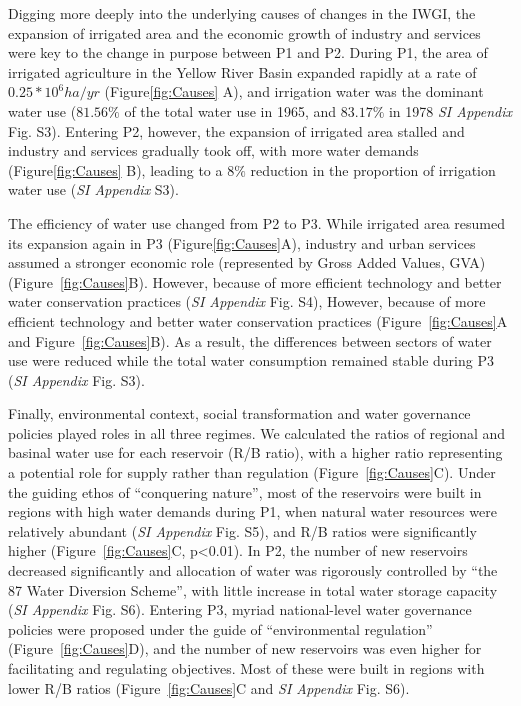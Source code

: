 \documentclass[9pt, twocolumn, twoside, lineno]{pnas-new}
\begin{document}
Digging more deeply into the underlying causes of changes in the IWGI, the expansion of irrigated area and the economic growth of industry and services were key to the change in purpose between P1 and P2. During P1, the area of irrigated agriculture in the Yellow River Basin expanded rapidly at a rate of $0.25*10^6 ha/yr$ (Figure\ref{fig:Causes} A), and irrigation water was the dominant water use ($81.56\%$ of the total water use in 1965, and $83.17\%$ in 1978 \textit{SI Appendix} Fig. S3). Entering P2, however, the expansion of irrigated area stalled and industry and services gradually took off, with more water demands (Figure\ref{fig:Causes} B), leading to a $8\%$ reduction in the proportion of irrigation water use (\textit{SI Appendix} S3).

The efficiency of water use changed from P2 to P3. While irrigated area resumed its expansion again in P3 (Figure\ref{fig:Causes}A), industry and urban services assumed a stronger economic role (represented by Gross Added Values, GVA) (Figure~\ref{fig:Causes}B). 
However, because of more efficient technology and better water conservation practices (\textit{SI Appendix} Fig. S4), However, because of more efficient technology and better water conservation practices (Figure~\ref{fig:Causes}A and Figure~\ref{fig:Causes}B). 
As a result, the differences between sectors of water use were reduced while the total water consumption remained stable during P3 (\textit{SI Appendix} Fig. S3).

Finally, environmental context, social transformation and water governance policies played roles in all three regimes. We calculated the ratios of regional and basinal water use for each reservoir (R/B ratio), with a higher ratio representing a potential role for supply rather than regulation (Figure~\ref{fig:Causes}C).
Under the guiding ethos of ``conquering nature'', most of the reservoirs were built in regions with high water demands during P1, when natural water resources were relatively abundant (\textit{SI Appendix} Fig. S5), and R/B ratios were significantly higher (Figure~\ref{fig:Causes}C, p<0.01). 
In P2, the number of new reservoirs decreased significantly and allocation of water was rigorously controlled by ``the 87 Water Diversion Scheme'', with little increase in total water storage capacity (\textit{SI Appendix} Fig. S6). 
Entering P3, myriad national-level water governance policies were proposed under the guide of ``environmental regulation'' (Figure~\ref{fig:Causes}D), and the number of new reservoirs was even higher for facilitating and regulating objectives. Most of these were built in regions with lower R/B ratios (Figure~\ref{fig:Causes}C and \textit{SI Appendix} Fig. S6).
\end{document}
